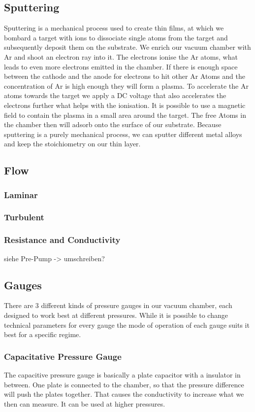 \documentclass[]{article}
\begin{document}
\subsection{Sputtering}
Sputtering is a mechanical process used to create thin films, at which we bombard a target with ions to dissociate single atoms from the target and subsequently deposit them on the substrate. We enrich our vacuum chamber with Ar and shoot an electron ray into it. The electrons ionise the Ar atoms, what leads to even more electrons emitted in the chamber. If there is enough space between the cathode and the anode for electrons to hit other Ar Atoms and the concentration of Ar is high enough they will form a plasma. To accelerate the Ar atoms towards the target we apply a DC voltage that also accelerates the electrons further what helps with the ionisation. It is possible to use a magnetic field to contain the plasma in a small area around the target. The free Atoms in the chamber then will adsorb onto the surface of our substrate. Because sputtering is a purely mechanical process, we can sputter different metal alloys and keep the stoichiometry on our thin layer.


\subsection{Flow}

\subsubsection{Laminar}


\subsubsection{Turbulent}


\subsubsection{Resistance and Conductivity}
siehe Pre-Pump -> umschreiben?

\subsection{Gauges}
There are 3 different kinds of pressure gauges in our vacuum chamber, each designed to work best at different pressures. While it is possible to change technical parameters for every gauge the mode of operation of each gauge suits it best for a specific regime.
\subsubsection[Capacitive]{Capacitative Pressure Gauge}
The capacitive pressure gauge is basically a plate capacitor with a insulator in between. One plate is connected to the chamber, so that the pressure difference will push the plates together. That causes the conductivity to increase what we then can measure. It can be used at higher pressures. 
\end{document}
